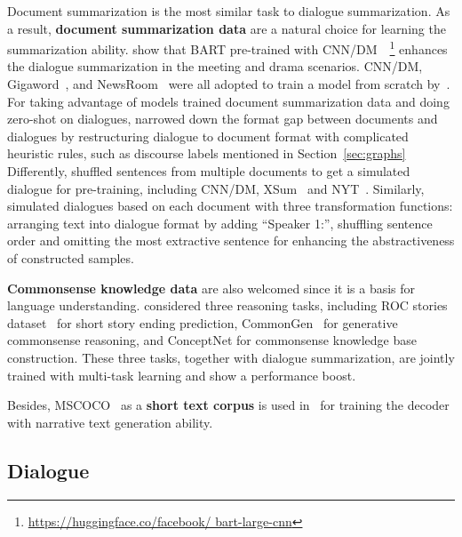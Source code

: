 Document summarization is the most similar task to dialogue summarization. As a result, \textbf{document summarization data} are a natural choice for learning the summarization ability.
\citet{zhang2021exploratory} show that BART pre-trained with 
CNN/DM~\cite{hermann2015teaching}~\footnote{\url{https://huggingface.co/facebook/ bart-large-cnn}} enhances the dialogue summarization in the meeting and drama scenarios.
CNN/DM, Gigaword~\cite{rush2015neural}, and 
NewsRoom~\cite{grusky2018newsroom} were all adopted to train a model from scratch by~\citet{zou2021low}.
For taking advantage of models trained document summarization data and doing zero-shot on dialogues, \citet{ganesh2019restructuring} narrowed down the format gap between documents and dialogues by restructuring dialogue to document format with complicated heuristic rules, such as discourse labels mentioned in Section~\ref{sec:graphs}
Differently, \citet{zhu2020end} shuffled sentences from multiple 
documents to get a simulated dialogue for pre-training, including 
CNN/DM, XSum~\cite{narayan2018don} and NYT~\cite{evan2008nyt}.
Similarly, \citet{park2022leveraging} simulated dialogues based on each document with three transformation functions: arranging text into dialogue format by adding ``Speaker 1:'', shuffling sentence order and omitting the most extractive sentence for enhancing the abstractiveness of constructed samples.


\textbf{Commonsense knowledge data} are also welcomed since it is a
basis for language understanding.
\citet{khalifa2021bag} considered three reasoning tasks, including ROC stories 
dataset~\cite{mostafazadeh2016corpus} for short story ending prediction, 
CommonGen~\cite{lin2020commongen} for generative commonsense reasoning, 
and ConceptNet for commonsense knowledge base construction. 
These three tasks, together with dialogue summarization, are jointly trained with multi-task learning and show a performance boost.

Besides, MSCOCO~\cite{lin2014microsoft} as a \textbf{short text corpus} is used in~\citet{zou2021low} for training the decoder with narrative text generation ability.


\subsection{Dialogue}

